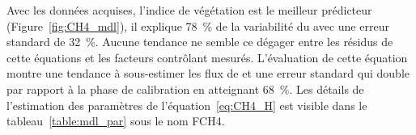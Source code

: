 Avec les données acquises, l'indice de végétation est le meilleur prédicteur (Figure~\ref{fig:CH4_mdl}), il explique \SI{78}{\percent} de la variabilité du \chh avec une erreur standard de \SI{32}{\percent}.
Aucune tendance ne semble ce dégager entre les résidus de cette équations et les facteurs contrôlant mesurés.
L'évaluation de cette équation montre une tendance à sous-estimer les flux de \chh et une erreur standard qui double par rapport à la phase de calibration en atteignant \SI{68}{\percent}.
Les détails de l'estimation des paramètres de l'équation~\ref{eq:CH4_H} est visible dans le tableau~\ref{table:mdl_par} sous le nom FCH4.


